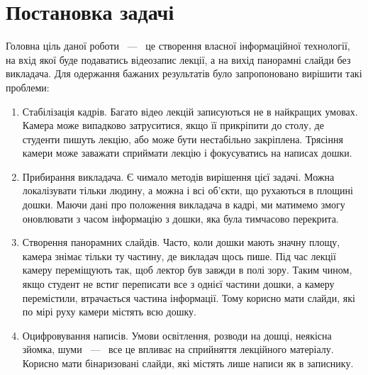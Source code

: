 \section{Постановка задачі}

Головна ціль даної роботи ~---~ це створення власної інформаційної технології,
на вхід якої буде подаватись відеозапис лекції, а на вихід панорамні слайди
без викладача.
Для одержання бажаних результатів було запропоновано
вирішити такі проблеми:
\begin{enumerate}
	\item
	      Стабілізація кадрів.
	      Багато відео лекцій записуються не в найкращих умовах.
	      Камера може випадково затруситися, якщо її прикріпити до столу,
	      де студенти пишуть лекцію, або може бути нестабільно закріплена.
          Трясіння камери може заважати сприймати лекцію і фокусуватись на написах дошки.
	\item
	      Прибирання викладача.
	      Є чимало методів вирішення цієї задачі. Можна локалізувати тільки
	      людину, а можна і всі об'єкти, що рухаються в площині дошки. Маючи
	      дані про положення викладача в кадрі, ми матимемо змогу оновлювати
	      з часом інформацію з дошки, яка була тимчасово перекрита.

	\item
	      Створення панорамних слайдів.
          Часто, коли дошки мають значну площу, камера знімає тільки ту частину, де
	      викладач щось пише. Під час лекції камеру переміщують так, щоб лектор був завжди
	      в полі зору. Таким чином, якщо студент не встиг переписати все з однієї частини
	      дошки, а камеру перемістили, втрачається частина інформації. Тому корисно
	      мати слайди, які по мірі руху камери містять всю дошку.

	\item
	      Оцифровування написів.
	      Умови освітлення, розводи на дошці, неякісна зйомка, шуми ~---~ все це впливає
          на сприйняття лекційного матеріалу. Корисно мати бінаризовані слайди,
          які містять лише написи як в записнику.
\end{enumerate}
